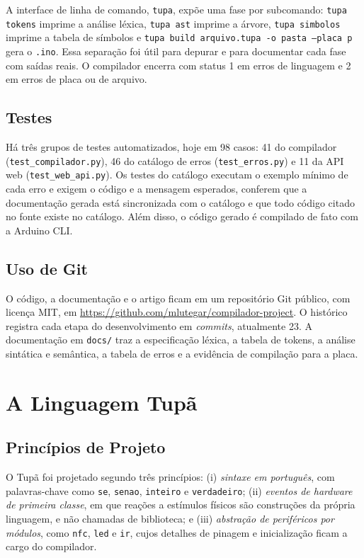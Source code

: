 \documentclass[conference]{IEEEtran}
\begin{document}
A interface de linha de comando, \texttt{tupa}, expõe uma fase por
subcomando: \texttt{tupa tokens} imprime a análise léxica, \texttt{tupa ast}
imprime a árvore, \texttt{tupa simbolos} imprime a tabela de símbolos e
\texttt{tupa build arquivo.tupa -o pasta --placa p} gera o \texttt{.ino}. Essa
separação foi útil para depurar e para documentar cada fase com saídas reais.
O compilador encerra com status 1 em erros de linguagem e 2 em erros de placa
ou de arquivo.

\subsection{Testes}
Há três grupos de testes automatizados, hoje em 98 casos: 41 do compilador
(\texttt{test\_compilador.py}), 46 do catálogo de erros
(\texttt{test\_erros.py}) e 11 da API web (\texttt{test\_web\_api.py}). Os
testes do catálogo executam o exemplo mínimo de cada erro e exigem o código e a
mensagem esperados, conferem que a documentação gerada está sincronizada com o
catálogo e que todo código citado no fonte existe no catálogo. Além disso, o
código gerado é compilado de fato com a Arduino CLI.

\subsection{Uso de Git}
O código, a documentação e o artigo ficam em um repositório Git público, com
licença MIT, em \url{https://github.com/mlutegar/compilador-project}. O histórico
registra cada etapa do desenvolvimento em \textit{commits}, atualmente 23. A
documentação em \texttt{docs/} traz a especificação léxica, a tabela de
tokens, a análise sintática e semântica, a tabela de erros e a evidência de
compilação para a placa.

\section{A Linguagem Tupã}\label{sec:linguagem}
\subsection{Princípios de Projeto}
O Tupã foi projetado segundo três princípios: (i) \emph{sintaxe em
português}, com palavras-chave como \texttt{se}, \texttt{senao},
\texttt{inteiro} e \texttt{verdadeiro}; (ii) \emph{eventos de hardware de
primeira classe}, em que reações a estímulos físicos são construções da
própria linguagem, e não chamadas de biblioteca; e (iii) \emph{abstração de
periféricos por módulos}, como \texttt{nfc}, \texttt{led} e \texttt{ir},
cujos detalhes de pinagem e inicialização ficam a cargo do compilador.
\end{document}
